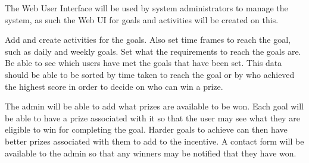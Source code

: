 The Web User Interface will be used by system administrators to manage the system, as such the Web UI for goals and activities will be created on this.

\FunqReq
{Add and create activities for the goals. Also set time frames to reach the goal, such as daily and weekly goals.}
{Set what the requirements to reach the goals are.}
{Be able to see which users have met the goals that have been set. This data should be able  to be sorted by time taken to reach the goal or by who achieved the highest score in order to decide on who can win a prize.}

\FuncReq
{The admin will be able to add what prizes are available to be won.}
{Each goal will be able to have a prize associated with it so that the user may see what they are eligible to win for completing the goal. Harder goals to achieve can then have better prizes associated with them to add to the incentive.}
{A contact form will be available to the admin so that any winners may be notified that they have won.}
